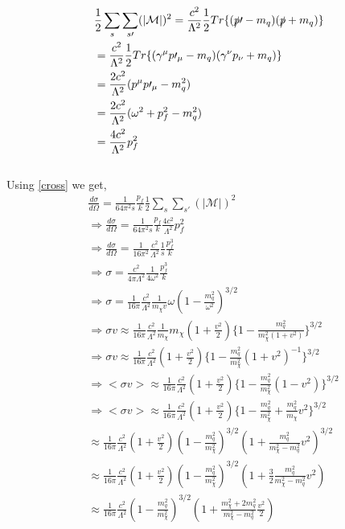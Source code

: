 \documentclass[12pt]{report}
\begin{document}
\begin{align*}
&\frac{1}{2} \sum_s \sum_{s\prime} (|\mathcal{M}|)^2 = \frac{c^2}{\Lambda^2} \frac{1}{2} Tr \{ ( \slashed{p}\prime-m_q)(\slashed{p}+m_q) \} \\
&=  \frac{c^2}{\Lambda^2} \frac{1}{2} Tr\{(\gamma^\mu p\prime_\mu -m_q)(\gamma^\nu p_\nu +m_q)  \}\\
&= \frac{2c^2}{\Lambda^2} (p^\mu p\prime_\mu-m_q^2)\\
&=\frac{2c^2}{\Lambda^2} (\omega^2+ p_f^2 -m_q^2)\\
&= \frac{4c^2}{\Lambda^2} p_f^2 
\end{align*}\\
Using \ref{cross} we get,
\begin{align*}
&\frac{d\sigma}{d\Omega}= \frac{1}{64 \pi^2 s} \frac{p_f}{k} \frac{1}{2} \sum_s \sum_{s\prime} (|\mathcal{M}|)^2\\
&\Rightarrow \frac{d\sigma}{d\Omega}=\frac{1}{64 \pi^2 s} \frac{p_f}{k} \frac{4c^2}{\Lambda^2} p_f^2\\
&\Rightarrow \frac{d\sigma}{d\Omega}= \frac{1}{16 \pi^2} \frac{c^2}{\Lambda^2} \frac{1}{s} \frac{p_f^3}{k}\\
&\Rightarrow \sigma = \frac{c^2}{4 \pi \Lambda^2} \frac{1}{4 \omega^2} \frac{p_f^3}{k}\\
&\Rightarrow \sigma =\frac{1}{16 \pi} \frac{c^2}{\Lambda^2} \frac{1}{m_\chi v} \omega (1-\frac{m_q^2}{\omega^2})^{3/2}\\
&\Rightarrow \sigma v \approx \frac{1}{16 \pi} \frac{c^2}{\Lambda^2} \frac{1}{m_\chi} m_\chi(1+\frac{v^2}{2}) \{1-\frac{m_q^2}{m_\chi^2(1+v^2)} \}^{3/2}\\
&\Rightarrow \sigma v \approx \frac{1}{16 \pi} \frac{c^2}{\Lambda^2} (1+\frac{v^2}{2}) \{1-\frac{m_q^2}{m_\chi^2}(1+v^2)^{-1} \}^{3/2}\\
&\Rightarrow <\sigma v> \approx \frac{1}{16 \pi} \frac{c^2}{\Lambda^2} (1+\frac{v^2}{2}) \{1-\frac{m_q^2}{m_\chi^2}(1-v^2) \}^{3/2}\\
&\Rightarrow <\sigma v> \approx \frac{1}{16 \pi} \frac{c^2}{\Lambda^2} (1+\frac{v^2}{2}) \{1-\frac{m_q^2}{m_\chi^2} + \frac{m_q^2}{m_\chi} v^2 \}^{3/2}\\
&\approx \frac{1}{16 \pi} \frac{c^2}{\Lambda^2} (1+\frac{v^2}{2}) (1-\frac{m_q^2}{m_\chi^2})^{3/2} (1+\frac{m_q^2}{m_\chi^2-m_q^2} v^2)^{3/2}\\
& \approx \frac{1}{16 \pi} \frac{c^2}{\Lambda^2} (1+\frac{v^2}{2}) (1-\frac{m_q^2}{m_\chi^2})^{3/2} (1+ \frac{3}{2} \frac{m_q^2}{m_\chi^2-m_q^2}v^2)\\
& \approx \frac{1}{16 \pi} \frac{c^2}{\Lambda^2} (1-\frac{m_q^2}{m_\chi^2})^{3/2} 
\left(1+ \frac{m_\chi^2 +2m_q^2}{m_\chi^2-m_q^2} \frac{v^2}{2}\right)
\end{align*}
\end{document}
